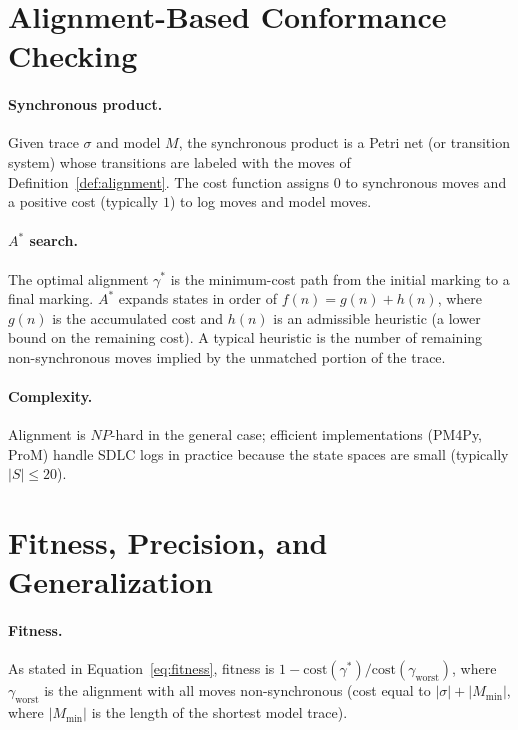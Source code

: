\section{Alignment-Based Conformance Checking}
\label{app:I-alignment}

\paragraph{Synchronous product.} Given trace $\sigma$ and model $M$, the
synchronous product is a Petri net (or transition system) whose
transitions are labeled with the moves of Definition~\ref{def:alignment}.
The cost function assigns $0$ to synchronous moves and a positive cost
(typically $1$) to log moves and model moves.

\paragraph{$A^*$ search.} The optimal alignment $\gamma^*$ is the
minimum-cost path from the initial marking to a final marking. $A^*$
expands states in order of $f(n) = g(n) + h(n)$, where $g(n)$ is the
accumulated cost and $h(n)$ is an admissible heuristic (a lower bound on
the remaining cost). A typical heuristic is the number of remaining
non-synchronous moves implied by the unmatched portion of the trace.

\paragraph{Complexity.} Alignment is $\mathit{NP}$-hard in the general
case; efficient implementations (PM4Py, ProM) handle SDLC logs in
practice because the state spaces are small (typically $|S| \leq 20$).


\section{Fitness, Precision, and Generalization}
\label{app:I-quality}

\paragraph{Fitness.} As stated in Equation~\ref{eq:fitness}, fitness is
$1 - \mathrm{cost}(\gamma^*) / \mathrm{cost}(\gamma_{\mathrm{worst}})$,
where $\gamma_{\mathrm{worst}}$ is the alignment with all moves
non-synchronous (cost equal to $|\sigma| + |M_{\min}|$, where
$|M_{\min}|$ is the length of the shortest model trace).

